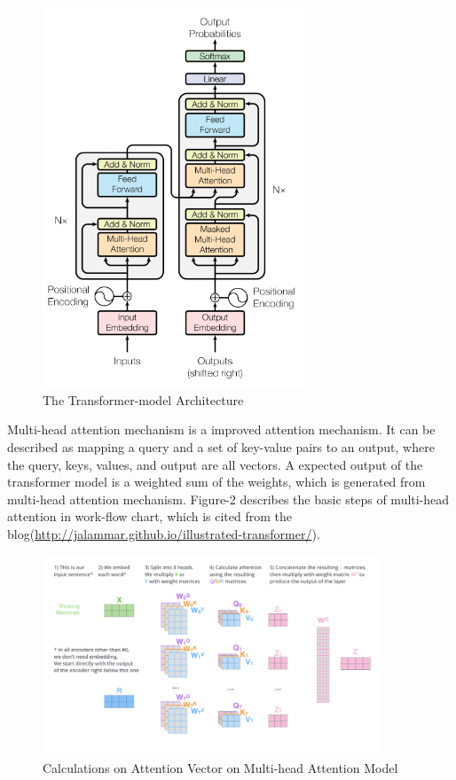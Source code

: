 \documentclass{article}
\begin{document}
\begin{figure}
    \centering
    \includegraphics[width=0.7\textwidth]{images/The Transformer Model Architecture.png}
    \caption{The Transformer-model Architecture}
\end{figure}


Multi-head attention mechanism is a improved attention mechanism. It can be described as mapping a query and a set of key-value pairs to an output, where the query, keys, values, and output are all vectors. A expected output of the transformer model is a weighted sum of the weights, which is generated from multi-head attention mechanism. Figure-2 describes the basic steps of multi-head attention in work-flow chart, which is cited from the blog(\url{http://jalammar.github.io/illustrated-transformer/}).

\begin{figure}
    \centering
    \includegraphics[width=0.9\textwidth]{images/Calculations on Attention Vector on Multi-head Attention Model.png}
    \caption{Calculations on Attention Vector on Multi-head Attention Model}
\end{figure}
\end{document}
